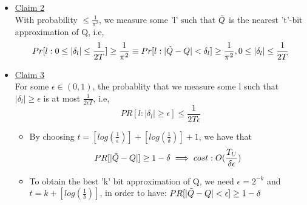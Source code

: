 \documentclass[11.5pt, paper=a4]{article}
\theoremstyle{definition}
\numberwithin{theorem}{section}
\begin{document}
\begin{itemize}
\begin{enumerate}
\begin{itemize}
                    \item \underline{Claim 2} \\
                        With probability $\le \frac{1}{\pi^{2}}$, we measure some 'l' such that $\Tilde{Q}$ is the nearest 't'-bit approximation of Q, i.e,
                        $$ Pr[l: 0 \le |\delta_{l}| \le \frac{1}{2T}] \ge \frac{1}{\pi^{2}} \equiv Pr[l: |\Tilde{Q}- Q| < \delta_{l}] \ge \frac{1}{\pi^{2}}, 0 \le |\delta_{l}|\le\frac{1}{2T}$$
                        
                    \item \underline{Claim 3} \\
                    For some $\epsilon \in (0,1)$, the probablity that we measure some l such that $|\delta_{l}|\ge \epsilon$ is at most $\frac{1}{2\epsilon T}$, i.e,
                    $$ PR[l: |\delta_{l}| \ge \epsilon] \le \frac{1}{2T\epsilon} $$
                        \begin{itemize}
                            \item By choosing $t=[log(\frac{1}{\epsilon})] + [log(\frac{1}{\delta})] + 1$, we have that
                            $$ PR[|\Tilde{Q}-Q|] \ge 1-\delta \implies cost: O(\frac{T_{U}}{\delta\epsilon}) $$
                            \item To obtain the best 'k' bit approximation of Q, we need $\epsilon =2^{-k}$ and $t=k + [log(\frac{1}{\delta})]$, in order to have: $PR[|\Tilde{Q}-Q|<\epsilon] \ge 1 - \delta$
                        \end{itemize}
                \end{itemize}
        \end{enumerate}
    \end{itemize}
\end{document}

